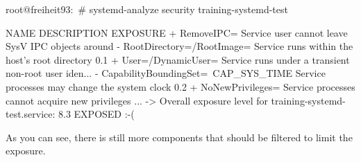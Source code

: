 \begin{bashinput}
root@freiheit93:~# systemd-analyze security training-systemd-test

  NAME                                                DESCRIPTION                                          EXPOSURE
+ RemoveIPC=                                          Service user cannot leave SysV IPC objects around
- RootDirectory=/RootImage=                           Service runs within the host's root directory             0.1
+ User=/DynamicUser=                                  Service runs under a transient non-root user iden...
- CapabilityBoundingSet=~CAP_SYS_TIME                 Service processes may change the system clock             0.2
+ NoNewPrivileges=                                    Service processes cannot acquire new privileges
...
-> Overall exposure level for training-systemd-test.service: 8.3 EXPOSED :-(
\end{bashinput}

As you can see, there is still more components that should be filtered to limit
the exposure.
